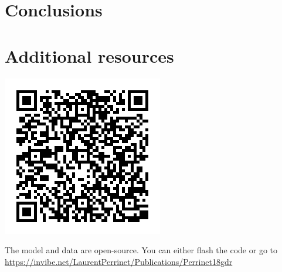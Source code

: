 \documentclass[a0,portrait]{a0poster}
\begin{document}
\begin{multicols}{3} %

\section*{Conclusions}


\color{Black} %

\section*{Additional resources}

\begin{minipage}{0.3\linewidth}
\includegraphics[width=1.\linewidth]{GitQR.png}
\end{minipage}\hfil
\begin{minipage}{0.67\linewidth}
The model and data are open-source. You can either flash the code or go to \url{https://invibe.net/LaurentPerrinet/Publications/Perrinet18gdr}
\end{minipage}

\end{multicols}
\end{document}
